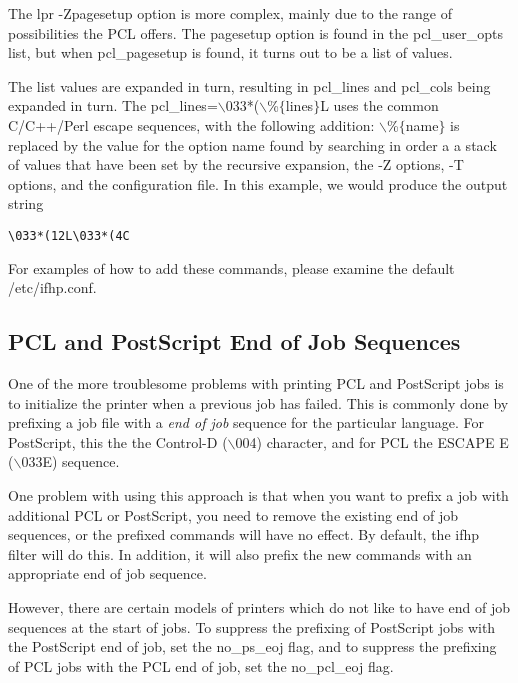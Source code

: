 \documentclass[a4paper]{article}
\begin{document}
The
{\ttfamily lpr -Zpagesetup}
option is more complex,
mainly due to the range of possibilities the PCL offers.
The
{\ttfamily pagesetup}
option is found in the
{\ttfamily pcl\_user\_opts} list,
but when
{\ttfamily pcl\_pagesetup}
is found,
it turns out to be a list of values.

The list values are expanded in turn,
resulting in
{\ttfamily pcl\_lines}
and
{\ttfamily pcl\_cols}
being expanded in turn.
The {\ttfamily pcl\_lines=$\backslash$033*($\backslash$\%$\{$lines$\}$L}
uses the common C/C++/Perl escape sequences,
with the following addition:
{\ttfamily $\backslash$\%$\{$name$\}$}
is replaced by the value for the option name found by searching
in order a
a stack of values that have been set by the recursive expansion,
the
{\ttfamily -Z} options,
{\ttfamily -T} options, 
and the configuration file.
In this example,
we would produce the output string
\begin{tscreen}
\begin{verbatim}
\033*(12L\033*(4C
\end{verbatim}
\end{tscreen}


For examples of how to add these commands,
please examine the default
{\ttfamily /etc/ifhp.conf}.


\subsection{PCL and PostScript End of Job Sequences
\label{no_ps_eoj}
\label{no_pcl_eoj}}

One of the more troublesome problems with printing PCL and PostScript
jobs is to initialize the printer when a previous job has failed.
This is commonly done by prefixing a job file with a
{\itshape end of job\/}
sequence for the particular language.
For PostScript,
this the the Control-D ({\ttfamily $\backslash$004}) character,
and for PCL the ESCAPE E ({\ttfamily $\backslash$033E}) sequence.

One problem with using this approach is that when you want to prefix a job
with additional PCL or PostScript,
you need to remove the existing end of job sequences,
or the prefixed commands will have no effect.
By default,
the {\ttfamily ifhp}
filter will do this.
In addition,
it will also
prefix the new commands with
an appropriate end of job sequence.

However,
there are certain models of printers which do not like to have
end of job sequences at the start of jobs.
To suppress the prefixing of PostScript jobs with the PostScript end of job,
set the
{\ttfamily no\_ps\_eoj}
flag,
and 
to suppress the prefixing of PCL jobs with the PCL end of job,
set the
{\ttfamily no\_pcl\_eoj}
flag.
\end{document}
